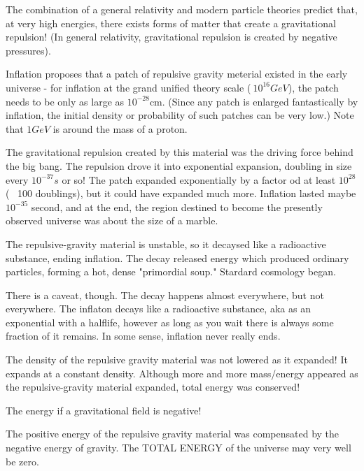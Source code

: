 The combination of a general relativity and modern particle theories predict that, at very high energies, there exists forms of matter that create a gravitational repulsion! (In general relativity, gravitational repulsion is created by negative pressures).

Inflation proposes that a patch of repulsive gravity meterial existed in the early universe - for inflation at the grand unified theory scale ($~10^16 GeV$), the patch needs to be only as large as $10^{-28}$cm. (Since any patch is enlarged fantastically by inflation, the initial density or probability of such patches can be very low.) Note that $1GeV$ is around the mass of a proton.

The gravitational repulsion created by this material was the driving force behind the big bang. The repulsion drove it into exponential expansion, doubling in size every $10^{-37}s$ or so! The patch expanded exponentially by a factor od at least $10^{28}$ (~ 100 doublings), but it could have expanded much more. Inflation lasted maybe $10^{-35}$ second, and at the end, the region destined to become the presently observed universe was about the size of a marble.

The repulsive-gravity material is unstable, so it decaysed like a radioactive substance, ending inflation. The decay released energy which produced ordinary particles, forming a hot, dense "primordial soup." Stardard cosmology began.

There is a caveat, though. The decay happens almost everywhere, but not everywhere. The inflaton decays like a radioactive substance, aka as an exponential with a halflife, however as long as you wait there is always some fraction of it remains. In some sense, inflation never really ends.

The density of the repulsive gravity material was not lowered as it expanded! It expands at a constant density. Although more and more mass/energy appeared as the repulsive-gravity material expanded, total energy was conserved!

\begin{center}
    The energy if a gravitational field is negative!
\end{center}

The positive energy of the repulsive gravity material was compensated by the negative energy of gravity. The TOTAL ENERGY of the universe may very well be zero.

